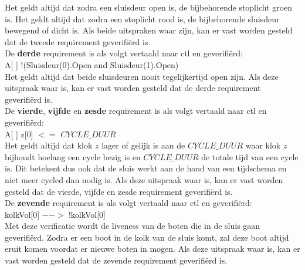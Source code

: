 \documentclass[../verslag.tex]{subfiles}
\begin{document}
Het geldt altijd dat zodra een sluisdeur open is, de bijbehorende stoplicht groen is.
Het geldt altijd dat zodra een stoplicht rood is, de bijbehorende sluisdeur bewegend of dicht is.
Als beide uitspraken waar zijn, kan er vast worden gesteld dat de tweede requirement geverifiërd is. \\

De \textbf{derde} requirement is als volgt vertaald naar ctl en geverifiërd: \\
A[ ] !(Sluisdeur(0).Open and Sluisdeur(1).Open) \\

Het geldt altijd dat beide sluisdeuren nooit tegelijkertijd open zijn.
Als deze uitspraak waar is, kan er vast worden gesteld dat de derde requirement geverifiërd is. \\

De \textbf{vierde}, \textbf{vijfde} en \textbf{zesde} requirement is als volgt vertaald naar ctl en geverifiërd: \\
A[ ] z[0] $<=$ $CYCLE\_DUUR$ \\

Het geldt altijd dat klok $z$ lager of gelijk is aan de $CYCLE\_DUUR$ waar klok $z$ bijhoudt hoelang een cycle bezig is en $CYCLE\_DUUR$ de totale tijd van een cycle is.
Dit betekent dus ook dat de sluis werkt aan de hand van een tijdschema en niet meer cycled dan nodig is.
Als deze uitspraak waar is, kan er vast worden gesteld dat de vierde, vijfde en zesde requirement geverifiërd is. \\

De \textbf{zevende} requirement is als volgt vertaald naar ctl en geverifiërd: \\
kolkVol[0] $-->$ !kolkVol[0] \\

Met deze verificatie wordt de liveness van de boten die in de sluis gaan geverifiërd. Zodra er een boot in de kolk van de sluis komt, zal deze boot altijd eruit komen voordat er nieuwe boten in mogen.
Als deze uitspraak waar is, kan er vast worden gesteld dat de zevende requirement geverifiërd is. \\
\end{document}
